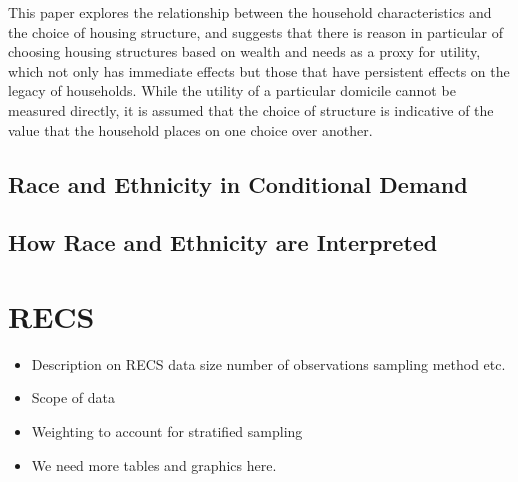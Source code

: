 \documentclass{article}
\begin{document}
This paper explores the relationship between the household characteristics and the choice of housing structure, and suggests that there is reason in particular of choosing housing structures based on wealth and needs as a proxy for utility, which not only has immediate effects but those that have persistent effects on the legacy of households.  While the utility of a particular domicile cannot be measured directly, it is assumed that the choice of structure is indicative of the value that the household places on one choice over another.  


% 





  \subsection{Race and Ethnicity in Conditional Demand}
  
  \subsection{How Race and Ethnicity are Interpreted}

\section{RECS}


\begin{itemize}
  \item Description on RECS data size number of observations sampling method etc.
  \item Scope of data  
  \item Weighting to account for stratified sampling
  \item We need more tables and graphics here.
\end{itemize}
\end{document}
